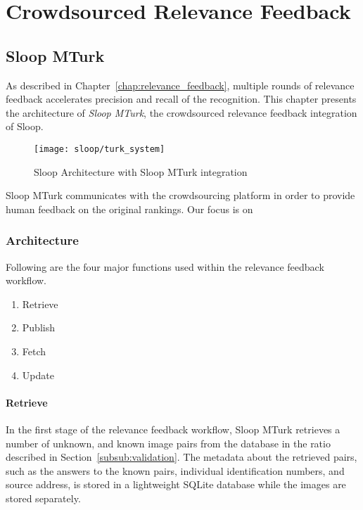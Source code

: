 \graphicspath{{./images/chap5/}}
\chapter{Crowdsourced Relevance Feedback}
\label{chap:sloop_mturk}
\section{Sloop MTurk}

As described in Chapter~\ref{chap:relevance_feedback}, multiple rounds of relevance
feedback accelerates precision and recall of the recognition. This chapter
presents the architecture of \emph{Sloop MTurk}, the crowdsourced relevance
feedback integration of Sloop.

\begin{figure}[htb]
  \centering
  \texttt{[image: sloop/turk\_system]}
  \caption{Sloop Architecture with Sloop MTurk integration}
  \label{fig:turk_overview} %
\end{figure}

Sloop MTurk communicates with the crowdsourcing platform in order to provide
human feedback on the original rankings. Our focus is on

\subsection{Architecture}

Following are the four major functions used within the relevance feedback
workflow.
\begin{enumerate}
	\item Retrieve
	\item Publish
	\item Fetch
	\item Update
\end{enumerate}

\subsubsection{Retrieve}

In the first stage of the relevance feedback workflow, Sloop MTurk retrieves a
number of unknown, and known image pairs from the database in the ratio
described in Section~\ref{subsub:validation}. The metadata about the retrieved pairs,
such as the answers to the known pairs, individual identification numbers, and
source address, is stored in a lightweight SQLite database while the images are
stored separately.

